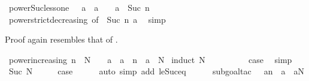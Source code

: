 \begin{isabellebody}
\endisatagproof
{\isafoldproof}%
%
\isadelimproof
\isanewline
%
\endisadelimproof
\isanewline
{}\isamarkupfalse%
\ power{\isacharunderscore}{\kern0pt}Suc{\isacharunderscore}{\kern0pt}less{\isacharunderscore}{\kern0pt}one{\isacharcolon}{\kern0pt}\ {\isachardoublequoteopen}{}\ {\isacharless}{\kern0pt}\ a\ {\isasymLongrightarrow}\ a\ {\isacharless}{\kern0pt}\ {}\ {\isasymLongrightarrow}\ a\ {\isacharcircum}{\kern0pt}\ Suc\ n\ {\isacharless}{\kern0pt}\ {}{\isachardoublequoteclose}\isanewline
%
\isadelimproof
\ \ %
\endisadelimproof
%
\isatagproof
{}\isamarkupfalse%
\ power{\isacharunderscore}{\kern0pt}strict{\isacharunderscore}{\kern0pt}decreasing\ {\isacharbrackleft}{\kern0pt}of\ {}\ {\isachardoublequoteopen}Suc\ n{\isachardoublequoteclose}\ a{\isacharbrackright}{\kern0pt}\ \isamarkupfalse%
\ simp%
\endisatagproof
{\isafoldproof}%
%
\isadelimproof
%
\endisadelimproof
%
\begin{isamarkuptext}%
Proof again resembles that of .%
\end{isamarkuptext}\isamarkuptrue%
\isamarkupfalse%
\ power{\isacharunderscore}{\kern0pt}increasing{\isacharcolon}{\kern0pt}\ {\isachardoublequoteopen}n\ {\isasymle}\ N\ {\isasymLongrightarrow}\ {}\ {\isasymle}\ a\ {\isasymLongrightarrow}\ a\ {\isacharcircum}{\kern0pt}\ n\ {\isasymle}\ a\ {\isacharcircum}{\kern0pt}\ N{\isachardoublequoteclose}\isanewline
%
\isadelimproof
%
\endisadelimproof
%
\isatagproof
{}\isamarkupfalse%
\ {\isacharparenleft}{\kern0pt}induct\ N{\isacharparenright}{\kern0pt}\isanewline
\ \ \isamarkupfalse%
\ {}\isanewline
\ \ \isamarkupfalse%
\ \isamarkupfalse%
\ {\isacharquery}{\kern0pt}case\ \isamarkupfalse%
\ simp\isanewline
{}\isamarkupfalse%
\isanewline
\ \ \isamarkupfalse%
\ {\isacharparenleft}{\kern0pt}Suc\ N{\isacharparenright}{\kern0pt}\isanewline
\ \ \isamarkupfalse%
\ \isamarkupfalse%
\ {\isacharquery}{\kern0pt}case\isanewline
\ \ \ \ \isamarkupfalse%
\ {\isacharparenleft}{\kern0pt}auto\ simp\ add{\isacharcolon}{\kern0pt}\ le{\isacharunderscore}{\kern0pt}Suc{\isacharunderscore}{\kern0pt}eq{\isacharparenright}{\kern0pt}\isanewline
\ \ \ \ \isamarkupfalse%
\ {\isacharparenleft}{\kern0pt}subgoal{\isacharunderscore}{\kern0pt}tac\ {\isachardoublequoteopen}{}\ {\isacharasterisk}{\kern0pt}\ a{\isacharcircum}{\kern0pt}n\ {\isasymle}\ a\ {\isacharasterisk}{\kern0pt}\ a{\isacharcircum}{\kern0pt}N{\isachardoublequoteclose}{\isacharparenright}{\kern0pt}\isanewline

\end{isabellebody}
